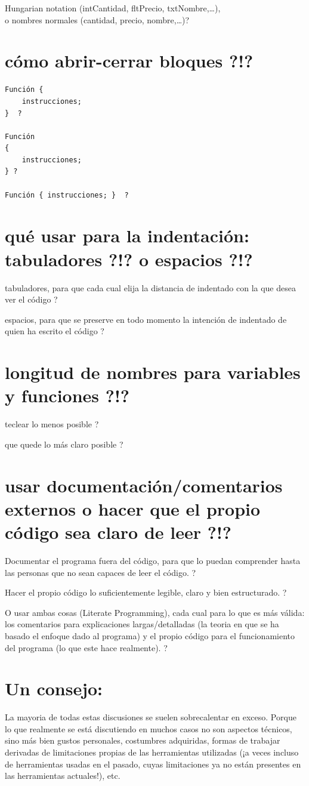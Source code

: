 \documentclass[spanish,12pt,a4paper,final,oneside]{book}
\begin{document}
\vspace{0.5cm}
Hungarian notation (intCantidad, fltPrecio, txtNombre,\ldots),
\\o nombres normales (cantidad, precio, nombre,\ldots)?

\section{cómo abrir-cerrar bloques ?!?}
\begin{lstlisting}[frame=single]
Función {
    instrucciones;
}  ?

Función
{
    instrucciones;
} ?

Función { instrucciones; }  ?
\end{lstlisting}

\section{qué usar para la indentación: tabuladores ?!? o espacios ?!? }
tabuladores, para que cada cual elija la distancia de indentado con la que desea ver el código ?

espacios, para que se preserve en todo momento la intención de indentado de quien ha escrito el código ? 

\section{longitud de nombres para variables y funciones ?!?}
teclear lo menos posible ?

que quede lo más claro posible ?

\section{usar documentación/comentarios externos o hacer que el propio código sea claro de leer ?!?}
Documentar el programa fuera del código, para que lo puedan comprender hasta las personas que no sean capaces de leer el código. ?

Hacer el propio código lo suficientemente legible, claro y bien estructurado. ?

O usar ambas cosas (Literate Programming), cada cual para lo que es más válida: los comentarios para explicaciones largas/detalladas (la teoria en que se ha basado el enfoque dado al programa) y el propio código para el funcionamiento del programa (lo que este hace realmente). ?

\section{Un consejo:}
La mayoria de todas estas discusiones se suelen sobrecalentar en exceso. Porque lo que realmente se está discutiendo en muchos casos no son aspectos técnicos, sino más bien gustos personales, costumbres adquiridas, formas de trabajar derivadas de limitaciones propias de las herramientas utilizadas (¡a veces incluso de herramientas usadas en el pasado, cuyas limitaciones ya no están presentes en las herramientas actuales!), etc.
\end{document}
